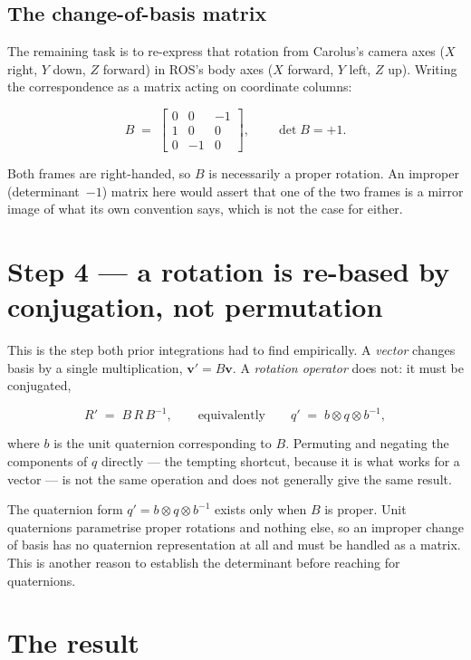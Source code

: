 \documentclass[11pt]{report}
\newenvironment{warningbox}%
  {\begin{lrbox}{\warnbox}\begin{minipage}{0.90\textwidth}}%
  {\end{minipage}\end{lrbox}%
   \begin{center}\fcolorbox{black}{codebg}{\usebox{\warnbox}}\end{center}}
\begin{document}
\subsection{The change-of-basis matrix}

The remaining task is to re-express that rotation from Carolus's camera axes
($X$ right, $Y$ down, $Z$ forward) in ROS's body axes ($X$ forward, $Y$ left,
$Z$ up). Writing the correspondence as a matrix acting on coordinate columns:

\[
B \;=\;
\begin{bmatrix}
0 & 0 & -1\\
1 & 0 & 0\\
0 & -1 & 0
\end{bmatrix},
\qquad \det B = +1 .
\]

Both frames are right-handed, so $B$ is necessarily a proper rotation. An
improper (determinant~$-1$) matrix here would assert that one of the two
frames is a mirror image of what its own convention says, which is not the
case for either.

\section{Step 4 --- a rotation is re-based by conjugation, not permutation}

This is the step both prior integrations had to find empirically. A
\emph{vector} changes basis by a single multiplication, $\mathbf{v}' =
B\mathbf{v}$. A \emph{rotation operator} does not: it must be conjugated,

\[
R' \;=\; B\,R\,B^{-1},
\qquad\text{equivalently}\qquad
q' \;=\; b \otimes q \otimes b^{-1},
\]

where $b$ is the unit quaternion corresponding to $B$. Permuting and
negating the components of $q$ directly --- the tempting shortcut, because it
is what works for a vector --- is not the same operation and does not
generally give the same result.

\begin{warningbox}
The quaternion form $q' = b \otimes q \otimes b^{-1}$ exists only when $B$ is
proper. Unit quaternions parametrise proper rotations and nothing else, so an
improper change of basis has no quaternion representation at all and must be
handled as a matrix. This is another reason to establish the determinant
before reaching for quaternions.
\end{warningbox}

\section{The result}
\end{document}
